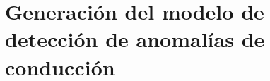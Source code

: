 
\chapter{Generaci\'{o}n del modelo de detecci\'{o}n de anomal\'{i}as de conducci\'{o}n}
\label{Capitulo 5}


